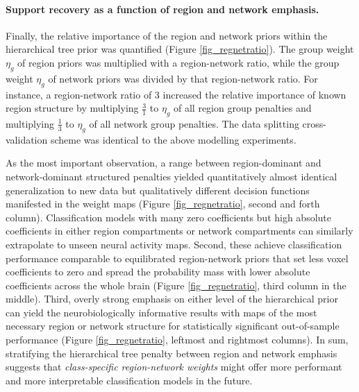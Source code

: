 \documentclass{article} %
\begin{document}
\paragraph{Support recovery as a function of region and network emphasis.}
Finally, the relative importance of the
region and network priors within the hierarchical tree prior
was quantified (Figure \ref{fig_regnetratio}).
The group weight $\eta_g$ of region priors was multiplied with a
region-network ratio, while the
group weight $\eta_g$ of network priors was divided by that
region-network ratio. For instance, a region-network ratio of 3
increased the relative importance of known region structure
by multiplying $\frac{3}{1}$ to
$\eta_g$ of all region group penalties
and multiplying
$\frac{1}{3}$ to $\eta_g$ of all network group penalties.
The data splitting cross-validation scheme was identical to the
above modelling experiments.


As the most important observation,
a range between region-dominant and network-dominant structured penalties
yielded quantitatively almost identical generalization to new data
but qualitatively different decision functions manifested in the weight maps
(Figure \ref{fig_regnetratio}, second and forth column).
Classification models with many zero coefficients but high absolute
coefficients in either region compartments or network compartments
can similarly extrapolate to unseen neural activity maps.
Second,
these achieve classification performance
comparable to equilibrated region-network priors
that set less voxel coefficients to zero and spread the
probability mass with lower absolute coefficients across the whole brain
(Figure \ref{fig_regnetratio}, third column in the middle).
Third,
overly strong emphasis on either level of the hierarchical prior
can yield the neurobiologically informative results with maps
of the most necessary region or network structure for
statistically significant out-of-sample performance
(Figure \ref{fig_regnetratio}, leftmost and rightmost columns).
%
In sum,
stratifying the hierarchical tree penalty between region and network emphasis
suggests that \textit{class-specific region-network weights}
might offer more performant and more interpretable classification models
in the future.
\end{document}
